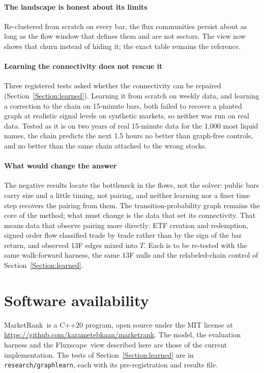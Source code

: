 \documentclass[preprint,3p,twocolumn]{elsarticle}
\newcommand{\MR}{MarketRank}
\newcommand{\FS}{Fluxscape}
\begin{document}
\paragraph{The landscape is honest about its limits} Re-clustered from scratch on every bar, the flux communities persist about as long as the flow window that defines them and are not sectors. The view now shows that churn instead of hiding it; the exact table remains the reference.

\paragraph{Learning the connectivity does not rescue it} Three registered tests asked whether the connectivity can be repaired (Section~\ref{Section:learned}). Learning it from scratch on weekly data, and learning a correction to the chain on 15-minute bars, both failed to recover a planted graph at realistic signal levels on synthetic markets, so neither was run on real data. Tested as it is on two years of real 15-minute data for the 1,000 most liquid names, the chain predicts the next 1.5 hours no better than graph-free controls, and no better than the same chain attached to the wrong stocks.

\paragraph{What would change the answer} The negative results locate the bottleneck in the flows, not the solver: public bars carry size and a little timing, not pairing, and neither learning nor a finer time step recovers the pairing from them. The transition-probability graph remains the core of the method; what must change is the data that set its connectivity. That means data that observe pairing more directly: ETF creation and redemption, signed order flow classified trade by trade rather than by the sign of the bar return, and observed 13F edges mixed into $T$. Each is to be re-tested with the same walk-forward harness, the same 13F nulls and the relabeled-chain control of Section~\ref{Section:learned}.

\section*{Software availability}
\MR\ is a C++20 program, open source under the MIT license at \url{https://github.com/karametebkaan/marketrank}. The model, the evaluation harness and the \FS\ view described here are those of the current implementation. The tests of Section~\ref{Section:learned} are in \texttt{research/graphlearn}, each with its pre-registration and results file.


\end{document}

